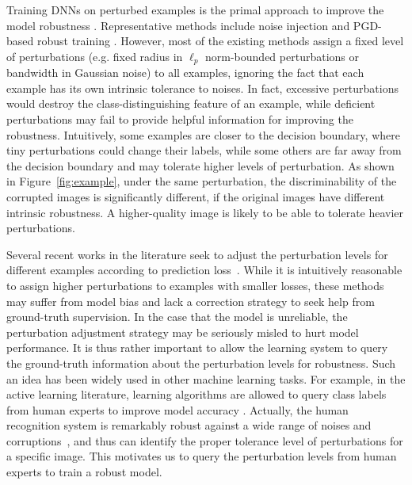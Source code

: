\documentclass[letterpaper]{article} %
\begin{document}
Training DNNs on perturbed examples is the primal approach to improve the model robustness \cite{carlini2019evaluating, hendrycks2019augmix}. Representative methods include noise injection \cite{grandvalet1997noise} and PGD-based robust training \cite{madry2017towards}. However, most of the existing methods assign a fixed level of perturbations (e.g. fixed radius in $\ell_p$ norm-bounded perturbations or bandwidth in Gaussian noise) to all examples, ignoring the fact that each example has its own intrinsic tolerance to noises. In fact, excessive perturbations would destroy the class-distinguishing feature of an example, while deficient perturbations may fail to provide helpful information for improving the robustness. Intuitively, some examples are closer to the decision boundary, where tiny perturbations could change their labels, while some others are far away from the decision boundary and may tolerate higher levels of perturbation. As shown in Figure~\ref{fig:example}, under the same perturbation, the discriminability of the corrupted images is significantly different, if the original images have different intrinsic robustness. A higher-quality image is likely to be able to tolerate heavier perturbations.

Several recent works in the literature seek to adjust the perturbation levels for different examples according to prediction loss~\cite{cheng2020cat, sitawarin2020improving, zhang2020attacks}. While it is intuitively reasonable to assign higher perturbations to examples with smaller losses, these methods may suffer from model bias and lack a correction strategy to seek help from ground-truth supervision. In the case that the model is unreliable, the perturbation adjustment strategy may be seriously misled to hurt model performance. It is thus rather important to allow the learning system to query the ground-truth information about the perturbation levels for robustness. Such an idea has been widely used in other machine learning tasks. For example, in the active learning literature, learning algorithms are allowed to query class labels from human experts to improve model accuracy \cite{settles2009active}. Actually, the human recognition system is remarkably robust against a wide range of noises and corruptions~\cite{rusak2020increasing}, and thus can identify the proper tolerance level of perturbations for a specific image. This motivates us to query the perturbation levels from human experts to train a robust model.
\end{document}
